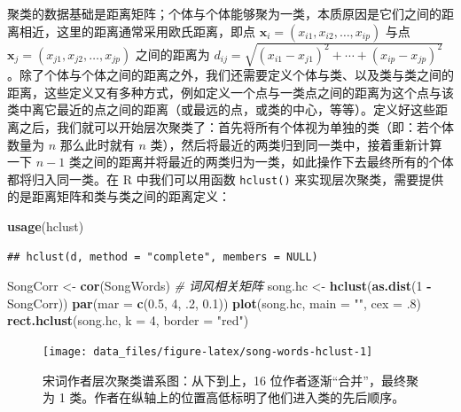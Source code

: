 \documentclass[
  b5paper,
  UTF8,twoside]{book}
\newenvironment{Shaded}{\begin{snugshade}}{\end{snugshade}}
\newcommand{\AttributeTok}[1]{\textcolor[rgb]{0.13,0.29,0.53}{#1}}
\newcommand{\CommentTok}[1]{\textcolor[rgb]{0.56,0.35,0.01}{\textit{#1}}}
\newcommand{\DecValTok}[1]{\textcolor[rgb]{0.00,0.00,0.81}{#1}}
\newcommand{\FloatTok}[1]{\textcolor[rgb]{0.00,0.00,0.81}{#1}}
\newcommand{\FunctionTok}[1]{\textcolor[rgb]{0.13,0.29,0.53}{\textbf{#1}}}
\newcommand{\NormalTok}[1]{#1}
\newcommand{\OtherTok}[1]{\textcolor[rgb]{0.56,0.35,0.01}{#1}}
\newcommand{\SpecialCharTok}[1]{\textcolor[rgb]{0.81,0.36,0.00}{\textbf{#1}}}
\newcommand{\StringTok}[1]{\textcolor[rgb]{0.31,0.60,0.02}{#1}}
\begin{document}
聚类的数据基础是距离矩阵；个体与个体能够聚为一类，本质原因是它们之间的距离相近，这里的距离通常采用欧氏距离，即点 \(\mathbf{x}_{i}=(x_{i1},x_{i2},\ldots,x_{ip})\) 与点 \(\mathbf{x}_{j}=(x_{j1},x_{j2},\ldots,x_{jp})\) 之间的距离为 \(d_{ij}=\sqrt{(x_{i1}-x_{j1})^{2}+\cdots+(x_{ip}-x_{jp})^{2}}\)。除了个体与个体之间的距离之外，我们还需要定义个体与类、以及类与类之间的距离，这些定义又有多种方式，例如定义一个点与一类点之间的距离为这个点与该类中离它最近的点之间的距离（或最远的点，或类的中心，等等）。定义好这些距离之后，我们就可以开始层次聚类了：首先将所有个体视为单独的类（即：若个体数量为 \(n\) 那么此时就有 \(n\) 类），然后将最近的两类归到同一类中，接着重新计算一下 \(n-1\) 类之间的距离并将最近的两类归为一类，如此操作下去最终所有的个体都将归入同一类。在 R 中我们可以用函数 \texttt{hclust()} 来实现层次聚类，需要提供的是距离矩阵和类与类之间的距离定义：

\begin{Shaded}
\begin{Highlighting}[]
\FunctionTok{usage}\NormalTok{(hclust)}
\end{Highlighting}
\end{Shaded}

\begin{verbatim}
## hclust(d, method = "complete", members = NULL)
\end{verbatim}

\begin{Shaded}
\begin{Highlighting}[]
\NormalTok{SongCorr }\OtherTok{\textless{}{-}} \FunctionTok{cor}\NormalTok{(SongWords) }\CommentTok{\# 词风相关矩阵}
\NormalTok{song.hc }\OtherTok{\textless{}{-}} \FunctionTok{hclust}\NormalTok{(}\FunctionTok{as.dist}\NormalTok{(}\DecValTok{1} \SpecialCharTok{{-}}\NormalTok{ SongCorr))}
\FunctionTok{par}\NormalTok{(}\AttributeTok{mar =} \FunctionTok{c}\NormalTok{(}\FloatTok{0.5}\NormalTok{, }\DecValTok{4}\NormalTok{, .}\DecValTok{2}\NormalTok{, }\FloatTok{0.1}\NormalTok{))}
\FunctionTok{plot}\NormalTok{(song.hc, }\AttributeTok{main =} \StringTok{""}\NormalTok{, }\AttributeTok{cex =}\NormalTok{ .}\DecValTok{8}\NormalTok{)}
\FunctionTok{rect.hclust}\NormalTok{(song.hc, }\AttributeTok{k =} \DecValTok{4}\NormalTok{, }\AttributeTok{border =} \StringTok{"red"}\NormalTok{)}
\end{Highlighting}
\end{Shaded}

\begin{figure}

{\centering \texttt{[image: data\_files/figure-latex/song-words-hclust-1]} 

}

\caption[宋词作者层次聚类谱系图]{宋词作者层次聚类谱系图：从下到上，16 位作者逐渐``合并''，最终聚为 1 类。作者在纵轴上的位置高低标明了他们进入类的先后顺序。}\label{fig:song-words-hclust}
\end{figure}
\end{document}
